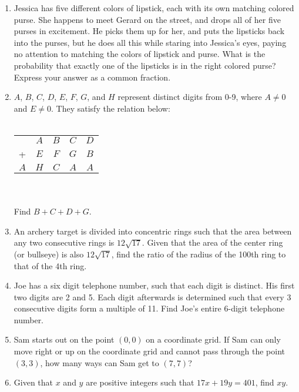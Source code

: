 \documentclass[11pt]{article}
\theoremstyle{definition}
\begin{document}
\begin{enumerate}
\item %
Jessica has five different colors of lipstick, each with its own matching colored purse. She happens to meet Gerard on the street, and drops all of her five purses in excitement. He picks them up for her, and puts the lipsticks back into the purses, but he does all this while staring into Jessica's eyes, paying no attention to matching the colors of lipstick and purse. What is the probability that exactly one of the lipsticks is in the right colored purse? Express your answer as a common fraction.

\item %
$A$, $B$, $C$, $D$, $E$, $F$, $G$, and $H$ represent distinct digits from 0-9, where $A \neq 0$ and $E \neq 0$. They satisfy the relation below:\\
\\
\begin{tabular}{c c c c c}
    & $A$ & $B$ & $C$ & $D$ \\
  + & $E$ & $F$ & $G$ & $B$ \\
  \hline
  $A$ & $H$ & $C$ & $A$ & $A$\\
\end{tabular}
\\
\\
Find $B+C+D+G$.

\item %
An archery target is divided into concentric rings such that the area between any two consecutive rings is $12\sqrt{17}$. Given that the area of the center ring (or bullseye) is also $12\sqrt{17}$, find the ratio of the radius of the 100th ring to that of the 4th ring.

\item %
Joe has a six digit telephone number, such that each digit is distinct. His first two digits are 2 and 5. Each digit afterwards is determined such that every 3 consecutive digits form a multiple of 11. Find Joe's entire 6-digit telephone number.

\item %
Sam starts out on the point $(0, 0)$ on a coordinate grid. If Sam can only move right or up on the coordinate grid and cannot pass through the point $(3, 3)$, how many ways can Sam get to $(7, 7)$?

\item %
Given that $x$ and $y$ are positive integers such that $17x+19y = 401$, find $xy$.


\end{enumerate}
\end{document}
